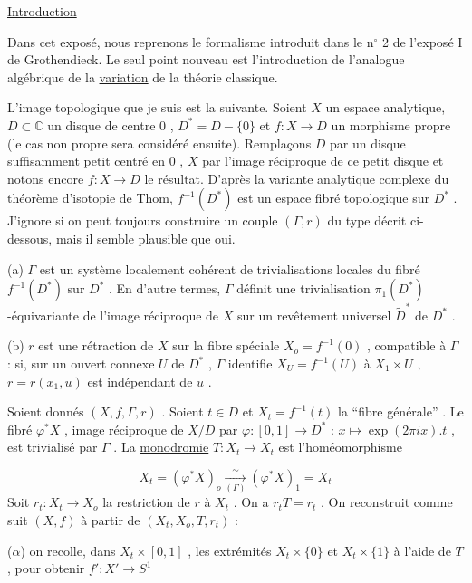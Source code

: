 


\underline{Introduction}

Dans cet exposé, nous reprenons le formalisme introduit dans le n$^\circ$ 2 de l'exposé I de Grothendieck. Le seul point nouveau est l'introduction de l'analogue algébrique de la \underline{variation} de la théorie classique.

L'image topologique que je suis est la suivante. Soient $X$ un espace analytique, $D \subset \mathbb{C}$ un disque de centre $0$ , $D^* = D - \{0\}$ et $f : X \to D$ un morphisme propre (le cas non propre sera considéré ensuite). Remplaçons $D$ par un disque suffisamment petit centré en $0$ , $X$ par l'image réciproque de ce petit disque et notons encore $f : X \to D$ le résultat. D'après la variante analytique complexe du théorème d'isotopie de Thom, $f^{-1}(D^*)$ est un espace fibré topologique sur $D^*$ . J'ignore si on peut toujours construire un couple $(\Gamma, r)$ du type décrit ci-dessous, mais il semble plausible que oui.

(a) $\Gamma$ est un système localement cohérent de trivialisations locales du fibré $f^{-1}(D^*)$ sur $D^*$ . En d'autre termes, $\Gamma$ définit une trivialisation $\pi_1(D^*)$-équivariante de l'image réciproque de $X$ sur un revêtement universel $\widetilde{D}^*$ de $D^*$ .

(b) $r$ est une rétraction de $X$ sur la fibre spéciale $X_o = f^{-1}(0)$ , compatible à $\Gamma$ : si, sur un ouvert connexe $U$ de $D^*$ , $\Gamma$ identifie $X_U = f^{-1}(U)$ à $X_1 \times U$ , $r = r(x_1, u)$ est indépendant de $u$ .

Soient donnés $(X, f, \Gamma , r)$ . Soient $t \in D$ et $X_t = f^{-1}(t)$ la ``fibre générale'' . Le fibré $\varphi^* X$ , image réciproque de $X/D$ par $\varphi : [0, 1] \to D^*$ : $x \longmapsto \exp(2 \pi i x).t$ , est trivialisé par $\Gamma$ . La \underline{monodromie} $T : X_t \longrightarrow X_t$ est l'homéomorphisme

\begin{equation*}
X_t = (\varphi^* X)_o \xrightarrow[(\Gamma)]{\sim} (\varphi^* X)_1 = X_t
\end{equation*}
Soit $r_t : X_t \longrightarrow X_o$ la restriction de $r$ à $X_t$ . On a $r_t T = r_t$ . On reconstruit comme suit $(X, f)$ à partir de $(X_t, X_o, T, r_t)$ :

($\alpha$) on recolle, dans $X_t \times [0, 1]$ , les extrémités $X_t \times \{0\}$ et $X_t \times \{1\}$ à l'aide de $T$ , pour obtenir $f' : X' \longrightarrow S^1$

